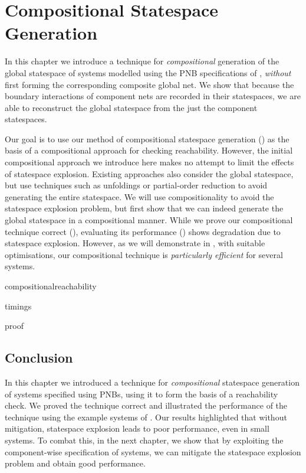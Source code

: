 \chapter{Compositional Statespace Generation}\label{chp:compChecking}

In this chapter we introduce a technique for \emph{compositional} generation of
the global statespace of systems modelled using the PNB specifications of
, \emph{without} first forming the corresponding
composite global net. We show that because the boundary interactions of
component nets are recorded in their statespaces, we are able to reconstruct
the global statespace from the just the component statespaces.

Our goal is to use our method of compositional statespace generation
() as the basis of a compositional approach for
checking reachability. However, the initial compositional approach we introduce
here makes no attempt to limit the effects of statespace explosion. Existing
approaches also consider the global statespace, but use techniques such as
unfoldings or partial-order reduction to avoid generating the entire
statespace. We will use compositionality to avoid the statespace explosion
problem, but first show that we can indeed generate the global statespace in a
compositional manner. While we prove our compositional technique correct
(), evaluating its performance ()
shows degradation due to statespace explosion. However, as we will demonstrate
in , with suitable optimisations, our
compositional technique is \emph{particularly efficient} for several systems.

{compositionalreachability}

{timings}

{proof}

\section{Conclusion}

In this chapter we introduced a technique for \emph{compositional} statespace
generation of systems specified using PNBs, using it to form the basis of
a reachability check. We proved the technique correct and illustrated the
performance of the technique using the example systems of
. Our results highlighted that without
mitigation, statespace explosion leads to poor performance, even in small
systems. To combat this, in the next chapter, we show that by exploiting
the component-wise specification of systems, we can mitigate the statespace
explosion problem and obtain good performance.
